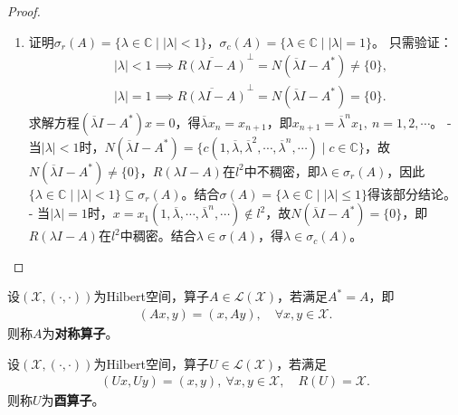 \documentclass[../../main.tex]{subfiles}%
\begin{document}
\begin{proof}
\begin{enumerate}[(1)]
\item 证明$\sigma_r(A)=\{\lambda\in\mathbb{C}\mid|\lambda|<1\}$，$\sigma_c(A)=\{\lambda\in\mathbb{C}\mid|\lambda|=1\}$。
只需验证：
\begin{align*}
&|\lambda|<1\implies \overline{R(\lambda I-A)}^{\perp}=N(\overline{\lambda}I-A^*)\neq\{0\},\\
&|\lambda|=1\implies \overline{R(\lambda I-A)}^{\perp}=N(\overline{\lambda}I-A^*)=\{0\}.
\end{align*}
求解方程$(\overline{\lambda}I-A^*)x=0$，得$\overline{\lambda}x_n=x_{n+1}$，即$x_{n+1}=\overline{\lambda}^n x_1,\ n=1,2,\cdots$。
- 当$|\lambda|<1$时，$N(\overline{\lambda}I-A^*)=\{c(1,\overline{\lambda},\overline{\lambda}^2,\cdots,\overline{\lambda}^n,\cdots)\mid c\in\mathbb{C}\}$，故$N(\overline{\lambda}I-A^*)\neq\{0\}$，$R(\lambda I-A)$在$l^2$中不稠密，即$\lambda\in\sigma_r(A)$，因此$\{\lambda\in\mathbb{C}\mid|\lambda|<1\}\subseteq\sigma_r(A)$。结合$\sigma(A)=\{\lambda\in\mathbb{C}\mid|\lambda|\leqslant1\}$得该部分结论。
- 当$|\lambda|=1$时，$x=x_1(1,\overline{\lambda},\cdots,\overline{\lambda}^n,\cdots)\notin l^2$，故$N(\overline{\lambda}I-A^*)=\{0\}$，即$R(\lambda I-A)$在$l^2$中稠密。结合$\lambda\in\sigma(A)$，得$\lambda\in\sigma_c(A)$。
\end{enumerate}

\end{proof}

\begin{definition}
设$(\mathscr{X},(\cdot,\cdot))$为Hilbert空间，算子$A\in\mathscr{L}(\mathscr{X})$，若满足$A^*=A$，即
\begin{align}
(Ax,y)=(x,Ay),\quad \forall x,y\in\mathscr{X}.
\label{eq:sym-op}
\end{align}
则称$A$为\textbf{对称算子}。
\end{definition}

\begin{definition}
设$(\mathscr{X},(\cdot,\cdot))$为Hilbert空间，算子$U\in\mathscr{L}(\mathscr{X})$，若满足
\begin{align}
(Ux,Uy)=(x,y),\ \forall x,y\in\mathscr{X},\quad R(U)=\mathscr{X}.
\label{eq:unitary-op}
\end{align}
则称$U$为\textbf{酉算子}。
\end{definition}
\end{document}
